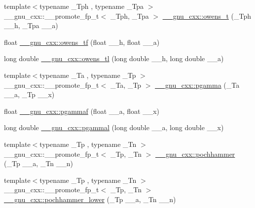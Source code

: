 \begin{DoxyCompactItemize}
\item 
{\footnotesize template$<$typename \+\_\+\+Tph , typename \+\_\+\+Tpa $>$ }\\\+\_\+\+\_\+gnu\+\_\+cxx\+::\+\_\+\+\_\+promote\+\_\+fp\+\_\+t$<$ \+\_\+\+Tph, \+\_\+\+Tpa $>$ \hyperlink{group__gnu__math__spec__func_gaa6ca4f2127c6c2101dc360673304cc2c}{\+\_\+\+\_\+gnu\+\_\+cxx\+::owens\+\_\+t} (\+\_\+\+Tph \+\_\+\+\_\+h, \+\_\+\+Tpa \+\_\+\+\_\+a)
\item 
float \hyperlink{group__gnu__math__spec__func_gac24d32e9b072c4953654d5559f992871}{\+\_\+\+\_\+gnu\+\_\+cxx\+::owens\+\_\+tf} (float \+\_\+\+\_\+h, float \+\_\+\+\_\+a)
\item 
long double \hyperlink{group__gnu__math__spec__func_ga7a8bc60dc0ef4a009586872eb7cac2d0}{\+\_\+\+\_\+gnu\+\_\+cxx\+::owens\+\_\+tl} (long double \+\_\+\+\_\+h, long double \+\_\+\+\_\+a)
\item 
{\footnotesize template$<$typename \+\_\+\+Ta , typename \+\_\+\+Tp $>$ }\\\+\_\+\+\_\+gnu\+\_\+cxx\+::\+\_\+\+\_\+promote\+\_\+fp\+\_\+t$<$ \+\_\+\+Ta, \+\_\+\+Tp $>$ \hyperlink{group__gnu__math__spec__func_gaa78927de2c62e6c63f4b3506f5e1a8f6}{\+\_\+\+\_\+gnu\+\_\+cxx\+::pgamma} (\+\_\+\+Ta \+\_\+\+\_\+a, \+\_\+\+Tp \+\_\+\+\_\+x)
\item 
float \hyperlink{group__gnu__math__spec__func_ga980f118a42eabd526da7988d96bf16a0}{\+\_\+\+\_\+gnu\+\_\+cxx\+::pgammaf} (float \+\_\+\+\_\+a, float \+\_\+\+\_\+x)
\item 
long double \hyperlink{group__gnu__math__spec__func_gab7975808066fe4a4c05823c57d4c5e73}{\+\_\+\+\_\+gnu\+\_\+cxx\+::pgammal} (long double \+\_\+\+\_\+a, long double \+\_\+\+\_\+x)
\item 
{\footnotesize template$<$typename \+\_\+\+Tp , typename \+\_\+\+Tn $>$ }\\\+\_\+\+\_\+gnu\+\_\+cxx\+::\+\_\+\+\_\+promote\+\_\+fp\+\_\+t$<$ \+\_\+\+Tp, \+\_\+\+Tn $>$ \hyperlink{group__gnu__math__spec__func_ga77878c3e202c7ec3d857c3fbf661001e}{\+\_\+\+\_\+gnu\+\_\+cxx\+::pochhammer} (\+\_\+\+Tp \+\_\+\+\_\+a, \+\_\+\+Tn \+\_\+\+\_\+n)
\item 
{\footnotesize template$<$typename \+\_\+\+Tp , typename \+\_\+\+Tn $>$ }\\\+\_\+\+\_\+gnu\+\_\+cxx\+::\+\_\+\+\_\+promote\+\_\+fp\+\_\+t$<$ \+\_\+\+Tp, \+\_\+\+Tn $>$ \hyperlink{group__gnu__math__spec__func_ga306d65eeea07613a777f506ffadac509}{\+\_\+\+\_\+gnu\+\_\+cxx\+::pochhammer\+\_\+lower} (\+\_\+\+Tp \+\_\+\+\_\+a, \+\_\+\+Tn \+\_\+\+\_\+n)
\item 

\end{DoxyCompactItemize}

